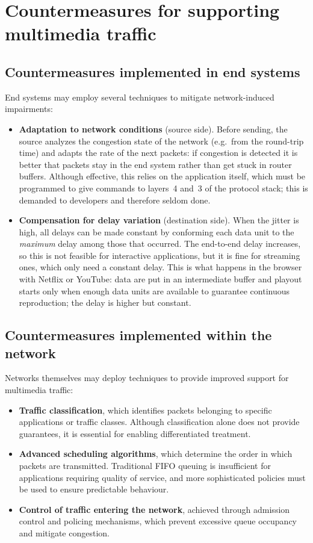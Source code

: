\documentclass[11pt,a4paper,openany]{report}
\begin{document}
\section{Countermeasures for supporting multimedia traffic}

\subsection{Countermeasures implemented in end systems}

End systems may employ several techniques to mitigate network-induced impairments:

\begin{itemize}
\item \textbf{Adaptation to network conditions} (source side). Before sending, the source analyzes the congestion state of the network (e.g.\ from the round-trip time) and adapts the rate of the next packets: if congestion is detected it is better that packets stay in the end system rather than get stuck in router buffers. Although effective, this relies on the application itself, which must be programmed to give commands to layers~4 and~3 of the protocol stack; this is demanded to developers and therefore seldom done.
\item \textbf{Compensation for delay variation} (destination side). When the jitter is high, all delays can be made constant by conforming each data unit to the \emph{maximum} delay among those that occurred. The end-to-end delay increases, so this is not feasible for interactive applications, but it is fine for streaming ones, which only need a constant delay. This is what happens in the browser with Netflix or YouTube: data are put in an intermediate buffer and playout starts only when enough data units are available to guarantee continuous reproduction; the delay is higher but constant.
\end{itemize}

\subsection{Countermeasures implemented within the network}

Networks themselves may deploy techniques to provide improved support for multimedia traffic:

\begin{itemize}
\item \textbf{Traffic classification}, which identifies packets belonging to specific applications or traffic classes. Although classification alone does not provide guarantees, it is essential for enabling differentiated treatment.
\item \textbf{Advanced scheduling algorithms}, which determine the order in which packets are transmitted. Traditional FIFO queuing is insufficient for applications requiring quality of service, and more sophisticated policies must be used to ensure predictable behaviour.
\item \textbf{Control of traffic entering the network}, achieved through admission control and policing mechanisms, which prevent excessive queue occupancy and mitigate congestion.
\end{itemize}
\end{document}
